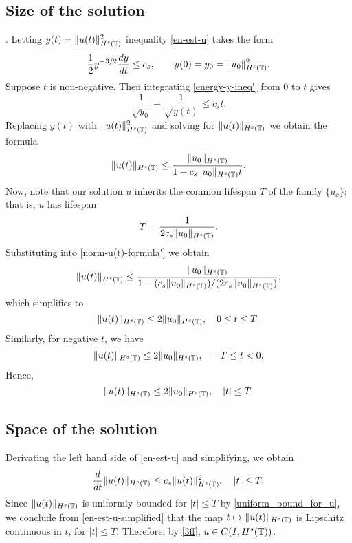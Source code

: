 \subsection{Size of the solution}. 
Letting  $y(t)=  \|u(t)\|_{H^s(\mathbb{T})}^2$ inequality \eqref{en-est-u}
takes the form
%
\begin{equation} 
\label{energy-y-ineq'}
\frac 12
y^{-3/2}\frac{dy}{dt}
\le
c_s,
\qquad
y(0)=y_0=  \|u_0\|_{H^s(\mathbb{T})}^2.
\end{equation}
%
Suppose $t$ is non-negative. Then integrating  \eqref{energy-y-ineq'}
from  0 to $t$ gives
%
\begin{equation*} 
\frac{1}{\sqrt{y_0}}  - \frac{1}{\sqrt{y(t)}} 
\le 
c_s t.
\end{equation*}
%
%
Replacing $y(t)$ with   $\|u(t)\|_{H^s(\mathbb{T})}^2$  and solving for  $\|u(t)\|_{H^s(\mathbb{T})}$
we obtain the formula
%
\begin{equation} 
\label{norm-u(t)-formula'}
\|u(t)\|_{H^s(\mathbb{T})}
\le
\frac{\|u_0\|_{H^s(\mathbb{T})}}{1-c_s\|u_0\|_{H^s(\mathbb{T})} t}.
\end{equation}
%
Now, note that our solution $u$ inherits the common lifespan $T$ of the family
$\{u_\ee\}$; that is, $u$ has lifespan
\begin{equation*}
T
=
\frac{1}{2 c_s \|u_0\|_{H^s(\mathbb{T})}}.
\end{equation*}
Substituting into \eqref{norm-u(t)-formula'} we obtain	
%
\begin{equation*} 
\label{u(t)-u(0)-bound'}
\|u(t)\|_{H^s(\mathbb{T})}
\le
\frac{\|u_0\|_{H^s(\mathbb{T})}}{1-(c_s\|u_0\|_{H^s(\mathbb{T})})/(2 c_s \|u_0\|_{H^s(\mathbb{T})})},
\end{equation*}
%
which simplifies to 
%
\begin{equation*}
\|u(t)\|_{H^s(\mathbb{T})}
\le
2 \|u_0\|_{H^s(\mathbb{T})},
\quad 
0\le t \le T.
\end{equation*}
Similarly, for negative $t$, we have
\begin{equation*}
\|u(t)\|_{H^s(\mathbb{T})}
\le
2 \|u_0\|_{H^s(\mathbb{T})},
\quad 
-T \le t < 0.
\end{equation*}
Hence,
\begin{equation}
\label{uniform_bound_for_u}
\|u(t)\|_{H^s(\mathbb{T})}
\le
2 \|u_0\|_{H^s(\mathbb{T})},
\quad 
|t| \le T.
\end{equation}
%
\subsection{Space of the solution}
Derivating the left hand side of \eqref{en-est-u} and simplifying, we obtain
\begin{equation}
\label{en-est-u-simplified}
\frac{d}{dt} \|u(t)\|_{H^s(\mathbb{T})} \le c_s \|u(t)\|_{H^s(\mathbb{T})}^2, \quad |t| \le T.
\end{equation}
Since $\|u(t)\|_{H^s(\mathbb{T})}$
is uniformly bounded for $|t| \le T$ by
\eqref{uniform_bound_for_u}, we conclude from
\eqref{en-est-u-simplified} that the map $t \mapsto
\|u(t)\|_{H^s(\mathbb{T})}$ is Lipschitz continuous in $t$, for $|t| \le T$.
Therefore, by \eqref{3ff}, $u \in C(I, H^s(\mathbb{T}))$. 
%
%
%
%
%
